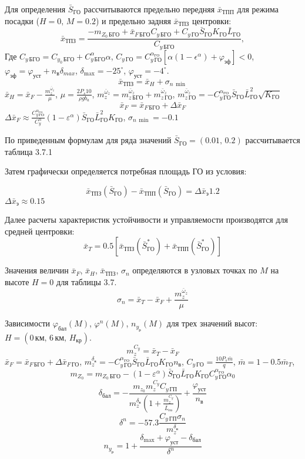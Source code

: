 Для определения $\bar{S}_{ГО}$ рассчитываются
предельно передняя $\bar{x}_{ТПП}$ для режима
посадки ($H=0,\, M=0.2$) и предельно задняя
$\bar{x}_{ТПЗ}$ центровки:
\[
    \bar{x}_{ТПЗ} = \frac{-m_{Z_0\, БГО} + \bar{x}_{F\, БГО}C_{y\, БГО}+ 
    C_{y\, ГО} \bar{S}_{ГО} K_{ГО} \bar{L}_{ГО}}{C_{y\, БГО}},
\]
Где $C_{y \, БГО} = C_{y_0\,{БГО}} + C_{y\, БГО}^\alpha \alpha$, 
$C_{y\, ГО} = C_{y\, ГО}^{\alpha_{ГО}} \left[ \alpha(1-\epsilon^\alpha) + 
\varphi_{эф}\right] < 0$, $\varphi_{эф} = \varphi_{уст} + n_в \delta_{max}$,
$\delta_{\max} = -25^\circ$, $\varphi_{уст} = -4^\circ$. 
\[
    \bar{x}_{ТПЗ} = \bar{x}_{H} + \sigma_{n\, \min}
\]
$\bar{x}_{H} = \bar{x}_F - \frac{m_z^{\bar{\omega}_z}}{\mu}$, $\mu = \frac{2 P_s 10 }{\rho g b_a}$,
$m_z^{\bar{\omega}_z} = m_{z\, БГО}^{\bar{\omega}_z}+m_{z\, ГО}^{\bar{\omega}_z}$,
$m_{z\, ГО}^{\bar{\omega}_z} = - C_{y\, {ГО}}^{\alpha_{ГО}} \bar{S}_{ГО} \bar{L}_{ГО}^2
\sqrt{K_{ГО}}$
\[
    \bar{x}_F = \bar{x}_{F\, БГО} + \Delta \bar{x}_F
\]
$ \Delta \bar{x}_F \approx \frac{C_{y\, ГО}^{\alpha_{ГО}} }{C_{y}^\alpha}
(1-\varepsilon^\alpha)\bar{S}_{ГО} \bar{L}_{ГО}^2
K_{ГО}$, $\sigma_{n\, \min} = -0.1$

По приведенным формулам для ряда значений
$\bar{S}_{ГО} = (0.01,\, 0.2)$ рассчитывается таблица
3.7.1

Затем графически определяется потребная площадь ГО из условия:

\[
    \bar{x}_{ТПЗ}(\bar{S}_{ГО}) - \bar{x}_{ТПП}(\bar{S}_{ГО}) = \Delta \bar{x}_{э} 1.2 
\]
$\Delta \bar{x}_{э} \approx 0.15$


Далее расчеты характеристик устойчивости и управляемости производятся
для средней центровки: 
\[
    \bar{x}_{T} = 0.5 \left[  \bar{x}_{ТПЗ}(\bar{S}_{ГО}^*) + \bar{x}_{ТПП}(\bar{S}_{ГО}^*) \right] 
\]

Значения величин $\bar{x}_F$, $\bar{x}_H$, $\bar{x}_{ТПЗ}$, $\sigma_n$ определяются в
узловых точках по $M$ на высоте $H=0$ для таблицы 3.7.
\[
    \sigma_n = \bar{x}_{T} - \bar{x}_{F} + \frac{m_z^{\bar{\omega}_z}}{\mu}
\]

Зависимости $\varphi_{бал}(M)$, $\varphi^n(M)$, $n_{y_р}(M)$ для трех значений
высот: $H=(0 \, км,\, 6 \, км,\, H_{кр})$.
\[
    m_z^{C_y} = \bar{x}_T - \bar{x}_F
\]
$\bar{x}_{F} = \bar{x}_{F\, БГО} + \Delta \bar{x}_{F\, ГО}$, $m_z^{\delta_в} = 
-C_{y\, {ГО}}^{\alpha_{ГО}} \bar{S}_{ГО} \bar{L}_{ГО} K_{ГО} n_в$, $C_{y\, {ГО}}
= \frac{10 P_s \bar{m}}{q}$, $\bar{m} = 1 - 0.5 \bar{m}_{T}$,
\[
    m_{Z_0} = m_{Z_0\, БГО} - 
    (1-\varepsilon^\alpha)\bar{S}_{ГО} \bar{L}_{ГО} K_{ГО} C_{y\,{ГО}}^{\alpha_{ГО}}
    \alpha_0
\]
\[
    \delta_{бал}  = - \frac{m_{z_0} m_z^{C_y} C_{y\, {ГП}}}{ m_z^{\delta_в}
    \left(1 + \frac{m_z^{C_y}}{\bar{L}_{го}}\right)} + \frac{\varphi_{уст}}{n_в}
\]
\[
    \delta^n = -57.3 \frac{C_{y\, ГП} \sigma_n}{ m_z^{\delta_в}}
\]
\[
    n_{y_р} = 1 + \frac{\delta_{\max} + \varphi_{уст} - \delta_{бал}}{\delta^n}
\]

